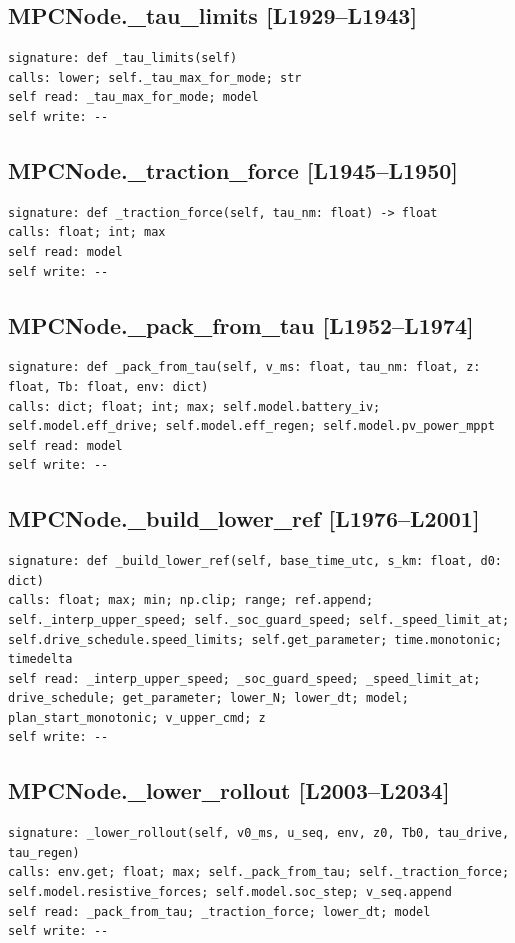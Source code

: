 \documentclass[a4paper,10pt,oneside]{book}
\begin{document}
\subsection*{MPCNode.\_tau\_limits [L1929--L1943]}
\begin{lstlisting}[numbers=none]
signature: def _tau_limits(self)
calls: lower; self._tau_max_for_mode; str
self read: _tau_max_for_mode; model
self write: --
\end{lstlisting}
\subsection*{MPCNode.\_traction\_force [L1945--L1950]}
\begin{lstlisting}[numbers=none]
signature: def _traction_force(self, tau_nm: float) -> float
calls: float; int; max
self read: model
self write: --
\end{lstlisting}
\subsection*{MPCNode.\_pack\_from\_tau [L1952--L1974]}
\begin{lstlisting}[numbers=none]
signature: def _pack_from_tau(self, v_ms: float, tau_nm: float, z: float, Tb: float, env: dict)
calls: dict; float; int; max; self.model.battery_iv; self.model.eff_drive; self.model.eff_regen; self.model.pv_power_mppt
self read: model
self write: --
\end{lstlisting}
\subsection*{MPCNode.\_build\_lower\_ref [L1976--L2001]}
\begin{lstlisting}[numbers=none]
signature: def _build_lower_ref(self, base_time_utc, s_km: float, d0: dict)
calls: float; max; min; np.clip; range; ref.append; self._interp_upper_speed; self._soc_guard_speed; self._speed_limit_at; self.drive_schedule.speed_limits; self.get_parameter; time.monotonic; timedelta
self read: _interp_upper_speed; _soc_guard_speed; _speed_limit_at; drive_schedule; get_parameter; lower_N; lower_dt; model; plan_start_monotonic; v_upper_cmd; z
self write: --
\end{lstlisting}
\subsection*{MPCNode.\_lower\_rollout [L2003--L2034]}
\begin{lstlisting}[numbers=none]
signature: _lower_rollout(self, v0_ms, u_seq, env, z0, Tb0, tau_drive, tau_regen)
calls: env.get; float; max; self._pack_from_tau; self._traction_force; self.model.resistive_forces; self.model.soc_step; v_seq.append
self read: _pack_from_tau; _traction_force; lower_dt; model
self write: --
\end{lstlisting}
\end{document}
